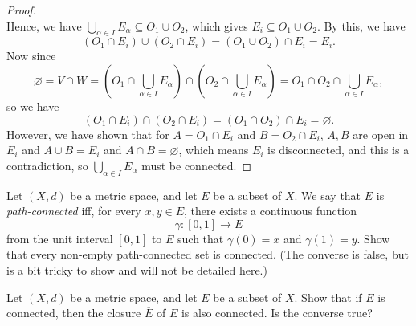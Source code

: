 \begin{proof}
\[    \]  Hence, we have \(\bigcup_{\alpha \in I} E_\alpha \subseteq O_1 \cup O_2\), which gives \(E_i \subseteq O_1 \cup O_2\). By this, we have
    \[
        (O_1 \cap E_i) \cup (O_2 \cap E_i) = (O_1 \cup O_2) \cap E_i = E_i.
    \]
    Now since 
    \[
        \varnothing = V \cap W = \left( O_1 \cap \bigcup_{\alpha \in I} E_\alpha \right) \cap \left( O_2 \cap \bigcup_{\alpha \in I} E_\alpha \right) = O_1 \cap O_2 \cap \bigcup_{\alpha \in I} E_\alpha, 
    \] so we have 
    \[
        \left( O_1 \cap E_i \right) \cap (O_2 \cap E_i)  = \left( O_1 \cap O_2 \right) \cap E_i = \varnothing. 
    \] However, we have shown that for \(A = O_1 \cap E_i\) and \(B = O_2 \cap E_i\), \(A, B\) are open in \(E_i\) and \(A \cup B = E_i\) and \(A \cap B = \varnothing \), which means \(E_i\) is disconnected, and this is a contradiction, so \(\bigcup_{\alpha \in I} E_\alpha\) must be connected.       
\end{proof}

\begin{problem}[20pts]
    Let $(X,d)$ be a metric space, and let $E$ be a subset of $X$.  
We say that $E$ is \emph{path-connected} iff, for every $x,y \in E$, there exists a continuous function  
\[
\gamma : [0,1] \to E
\]
from the unit interval $[0,1]$ to $E$ such that $\gamma(0)=x$ and $\gamma(1)=y$.  
Show that every non-empty path-connected set is connected.  
(The converse is false, but is a bit tricky to show and will not be detailed here.)
\end{problem}

\begin{problem}[15pts]
    Let $(X,d)$ be a metric space, and let $E$ be a subset of $X$.  
Show that if $E$ is connected, then the closure $\overline{E}$ of $E$ is also connected.  
Is the converse true?
\end{problem}

